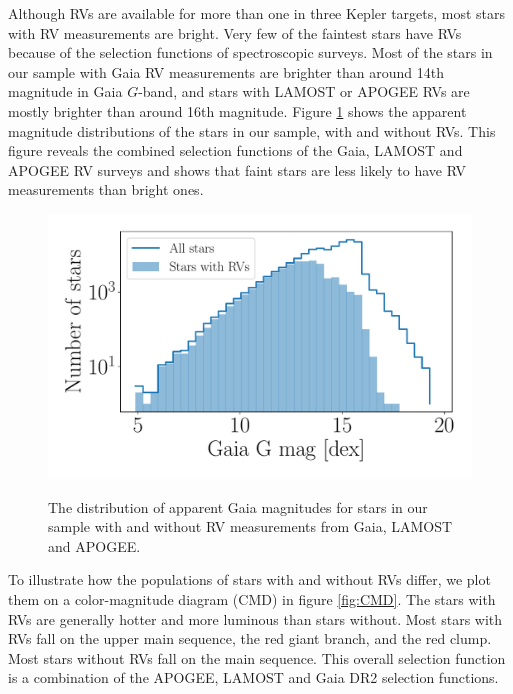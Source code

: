 Although RVs are available for more than one in three Kepler targets, most
stars with RV measurements are bright.
Very few of the faintest stars have RVs because of the selection functions of
spectroscopic surveys.
Most of the stars in our sample with Gaia RV measurements are brighter than
around 14th magnitude in Gaia $G$-band, and stars with LAMOST or APOGEE RVs
are mostly brighter than around 16th magnitude.
Figure \ref{fig:rv_histogram} shows the apparent magnitude distributions of
the stars in our sample, with and without RVs.
This figure reveals the combined selection functions of the Gaia, LAMOST and
APOGEE RV surveys and shows that faint stars are less likely to have RV
measurements than bright ones.
\begin{figure}[ht!]
\caption{
    The distribution of apparent Gaia magnitudes for
    stars in our sample with and without RV measurements from Gaia, LAMOST and
    APOGEE.
}
  \centering \includegraphics[width=.5\textwidth]{rv_histogram}
\label{fig:rv_histogram}
\end{figure}

To illustrate how the populations of stars with and without RVs differ, we
plot them on a color-magnitude diagram (CMD) in figure \ref{fig:CMD}.
The stars with RVs are generally hotter and more luminous than stars without.
Most stars with RVs fall on the upper main sequence, the red giant branch, and
the red clump.
Most stars without RVs fall on the main sequence.
This overall selection function is a combination of the APOGEE, LAMOST and
Gaia DR2 selection functions.

